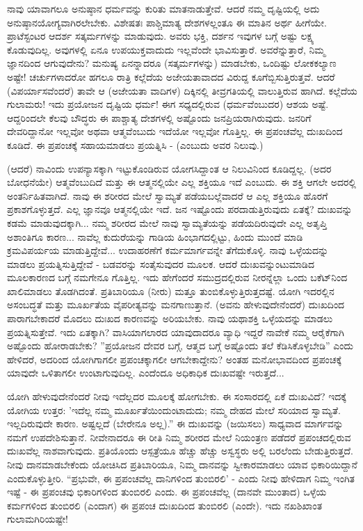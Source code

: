 ನಾವು ಯಾವಾಗಲೂ ಅನುಷ್ಠಾನ ಧರ್ಮವನ್ನು ಕುರಿತು ಮಾತನಾಡುತ್ತೇವೆ. ಆದರೆ ನಮ್ಮ ದೃಷ್ಟಿಯಲ್ಲಿ ಅದು ಅನುಷ್ಠಾನಯೋಗ್ಯವಾಗಿರಲೇಬೇಕು. ವಿಶೇಷತಃ ಪಾಶ್ಚಿಮಾತ್ಯ ದೇಶಗಳಲ್ಲಂತೂ ಈ ಮಾತಿನ ಅರ್ಥ ಹೀಗೆಯೇ. ಪ್ರಾಟೆಸ್ಟಂಟರ ಆದರ್ಶ ಸತ್ಕರ್ಮಗಳನ್ನು ಮಾಡುವುದು. ಅವರು ಭಕ್ತಿ, ದರ್ಶನ ಇವುಗಳ ಬಗ್ಗೆ ಅಷ್ಟು ಲಕ್ಷ್ಯ ಕೊಡುವುದಿಲ್ಲ. ಅವುಗಳಲ್ಲಿ ಏನೂ ಉಪಯುಕ್ತವಾದುದು ಇಲ್ಲವೆಂದೇ ಭಾವಿಸುತ್ತಾರೆ. ಅವರೆನ್ನುತ್ತಾರೆ, ನಿಮ್ಮ ಜ್ಞಾನದಿಂದ ಆಗುವುದೇನು? ಮನುಷ್ಯ ಏನನ್ನಾದರೂ (ಸತ್ಕರ್ಮಗಳನ್ನು) ಮಾಡಬೇಕು, ಒಂದಿಷ್ಟು ಲೋಕಕಲ್ಯಾಣ ಅಷ್ಟೇ! ಚರ್ಚುಗಳಾದರೋ ಹಗಲೂ ರಾತ್ರಿ ಕಲ್ಲೆದೆಯ ಅಜೇಯತಾವಾದದ ವಿರುದ್ದ ಕೂಗೆಬ್ಬಿಸುತ್ತಿರುತ್ತವೆ. ಆದರೆ \break (ವಿಪರ್ಯಾಸವೆಂದರೆ) ತಾವೇ ಆ (ಅಜೇಯತಾ ವಾದಿಗಳ) ದಿಕ್ಕಿನಲ್ಲಿ ತೀವ್ರಗತಿಯಲ್ಲಿ ವಾಲುತ್ತಿರುವ ಹಾಗಿದೆ. ಕಲ್ಲೆದೆಯ ಗುಲಾಮರು! ಇದು ಪ್ರಯೋಜನ ದೃಷ್ಟಿಯ ಧರ್ಮ! ಈಗ ಸಧ್ಯದಲ್ಲಿರುವ (ಧರ್ಮವೆಂಬುದರ) ಆಶಯ ಅಷ್ಟೆ. ಆದ್ದರಿಂದಲೇ ಕೆಲವು ಬೌದ್ಧರು ಈ ಪಾಶ್ಚಾತ್ಯ ದೇಶಗಳಲ್ಲಿ ಅಷ್ಟೊಂದು ಜನಪ್ರಿಯರಾಗಿರುವುದು. ಜನರಿಗೆ ದೇವರಿದ್ದಾನೋ ಇಲ್ಲವೋ ಅಥವಾ ಆತ್ಮವೆಂಬುದು ಇದೆಯೋ ಇಲ್ಲವೋ ಗೊತ್ತಿಲ್ಲ. ಈ ಪ್ರಪಂಚವೆಲ್ಲ ದುಃಖದಿಂದ ಕೂಡಿದೆ. ಈ ಪ್ರಪಂಚಕ್ಕೆ ಸಹಾಯಮಾಡಲು ಪ್ರಯತ್ನಿಸಿ - (ಎಂಬುದು ಅವರ ನಿಲುವು.)

(ಆದರೆ) ನಾವಿಂದು ಉಪನ್ಯಾಸಕ್ಕಾಗಿ ಇಟ್ಟುಕೊಂಡಿರುವ ಯೋಗಸಿದ್ದಾಂತ ಆ ನಿಲುವಿನಿಂದ ಕೂಡಿದ್ದಲ್ಲ. (ಅದರ ಬೋಧನೆಯೇ) ಆತ್ಮವೆಂಬುದಿದೆ ಮತ್ತು ಈ ಆತ್ಮನಲ್ಲಿಯೇ ಎಲ್ಲ ಶಕ್ತಿಯೂ ಇದೆ ಎಂಬುದು. ಈ ಶಕ್ತಿ ಆಗಲೇ ಅದರಲ್ಲಿ ಅಂತರ್ನಿಹಿತವಾಗಿದೆ. ನಾವು ಈ ಶರೀರದ ಮೇಲೆ ಸ್ವಾಮ್ಯತೆ ಪಡೆಯಬಲ್ಲೆವಾದರೆ ಆ ಎಲ್ಲ ಶಕ್ತಿಯೂ ಹೊರಗೆ ಪ್ರಕಾಶಗೊಳ್ಳುತ್ತದೆ. ಎಲ್ಲ ಜ್ಞಾನವೂ ಆತ್ಮನಲ್ಲಿಯೇ ಇದೆ. ಜನ ಇಷ್ಟೊಂದು ಪರದಾಡುತ್ತಿರುವುದು ಏತಕ್ಕೆ? ದುಃಖವನ್ನು ಕಡಮೆ ಮಾಡುವುದಕ್ಕಾಗಿ... ನಮ್ಮ ಶರೀರದ ಮೇಲೆ ನಾವು ಸ್ವಾಮ್ಯತೆಯನ್ನು ಪಡೆಯದಿರುವುದೇ ಎಲ್ಲ ಅತೃಪ್ತಿ ಅಶಾಂತಿಗೂ ಕಾರಣ... ನಾವೆಲ್ಲ ಕುದುರೆಯನ್ನು ಗಾಡಿಯ ಹಿಂಭಾಗದಲ್ಲಿಟ್ಟು, ಹಿಂದು ಮುಂದೆ ಮಾಡಿ ಕ್ರಮವಿಪರ್ಯಯ ಮಾಡುತ್ತಿದ್ದೇವೆ... ಉದಾಹರಣೆಗೆ ಕರ್ಮಮಾರ್ಗವನ್ನೇ ತೆಗೆದುಕೊಳ್ಳಿ. ನಾವು ಒಳ್ಳೆಯದನ್ನು ಮಾಡಲು ಪ್ರಯತ್ನಿಸುತ್ತಿದ್ದೇವೆ - ಬಡವರನ್ನು ಸಂತೈಸುವುದರ ಮೂಲಕ. ಆದರೆ ದುಃಖವನ್ನುಂಟುಮಾಡಿದ ಮೂಲಕಾರಣದ ಬಗ್ಗೆ ನಮಗೇನೂ ಗೊತ್ತಿಲ್ಲ. ಇದು ಹೇಗೆಂದರೆ ಸಮುದ್ರದಲ್ಲಿರುವ ನೀರನ್ನೆಲ್ಲಾ ಒಂದು ಬಕೆಟ್‌ನಿಂದ ಖಾಲಿಮಾಡಲು ತೊಡಗಿದಂತೆ. ಪ್ರತಿಬಾರಿಯೂ (ನೀರು) ಮತ್ತೂ ತುಂಬಿಕೊಳ್ಳುತ್ತಿರುತ್ತದಷ್ಟೆ. ಯೋಗಿ ಇದರಲ್ಲಿನ ಅಸಂಬದ್ಧತೆ ಮತ್ತು ಮೂರ್ಖತೆಯ ವೈಪರೀತ್ಯವನ್ನು ಮನಗಾಣುತ್ತಾನೆ. (ಅವನು ಹೇಳುವುದೇನೆಂದರೆ) ದುಃಖದಿಂದ ಪಾರಾಗಬೇಕಾದರೆ ಮೊದಲು ದುಃಖದ ಕಾರಣವನ್ನು ಅರಿಯಬೇಕು. ನಾವು ಯಥಾಶಕ್ತಿ ಒಳ್ಳೆಯದನ್ನು ಮಾಡಲು ಪ್ರಯತ್ನಿಸುತ್ತೇವೆ. ಇದು ಏತಕ್ಕಾಗಿ? ವಾಸಿಯಾಗಲಾರದ ಯಾವುದಾದರೂ ವ್ಯಾಧಿ ಇದ್ದರೆ ನಾವೇಕೆ ನಮ್ಮ ಆರೈಕೆಗಾಗಿ ಅಷ್ಟೊಂದು ಹೋರಾಡಬೇಕು? ''ಪ್ರಯೋಜನ ದೇವರ ಬಗ್ಗೆ, ಆತ್ಮದ ಬಗ್ಗೆ ಅಷ್ಟೊಂದು ತಲೆ ಕೆಡಿಸಿಕೊಳ್ಳಬೇಡಿ'' ಎಂದು ಹೇಳಿದರೆ, ಅದರಿಂದ ಯೋಗಿಗಾಗಲೀ ಪ್ರಪಂಚಕ್ಕಾಗಲೀ ಆಗಬೇಕಾದ್ದೇನು? ಅಂತಹ ಮನೋಭಾವದಿಂದ ಪ್ರಪಂಚಕ್ಕೆ ಯಾವುದೇ ಒಳಿತಾಗಲೀ ಉಂಟಾಗುವುದಿಲ್ಲ. ಎಂದೆಂದೂ ಅಧಿಕಾಧಿಕ ದುಃಖವಷ್ಟೇ ಇರುತ್ತದೆ...

ಯೋಗಿ ಹೇಳುವುದೇನೆಂದರೆ ನೀವು ಇದೆಲ್ಲದರ ಮೂಲಕ್ಕೆ ಹೋಗಬೇಕು. ಈ ಸಂಸಾರದಲ್ಲಿ ಏಕೆ ದುಃಖವಿದೆ? ಇದಕ್ಕೆ ಯೋಗಿಯ ಉತ್ತರ: 'ಇದೆಲ್ಲ ನಮ್ಮ ಮೂರ್ಖತೆಯಿಂದುಂಟಾದುದು; ನಮ್ಮ ದೇಹದ ಮೇಲೆ ಸರಿಯಾದ ಸ್ವಾಮ್ಯತೆ. ಇಲ್ಲದಿರುವುದೇ ಕಾರಣ. ಅಷ್ಟಲ್ಲದೆ (ಬೇರೇನೂ ಅಲ್ಲ).” ಈ ದುಃಖವನ್ನು (ಜಯಿಸಲು) ಸಾಧ್ಯವಾದ ಮಾರ್ಗವನ್ನು ನಮಗೆ ಉಪದೇಶಿಸುತ್ತಾನೆ. ನೀವೇನಾದರೂ ಈ ರೀತಿ ನಿಮ್ಮ ಶರೀರದ ಮೇಲೆ ನಿಯಂತ್ರಣ ಪಡೆದರೆ ಪ್ರಪಂಚದಲ್ಲಿರುವ ದುಃಖವೆಲ್ಲ ನಾಶವಾಗುವುದು. ಪ್ರತಿಯೊಂದು ಆಸ್ಪತ್ರೆಯೂ ಹೆಚ್ಚು ಹೆಚ್ಚು ಅಸ್ವಸ್ಥರು ಅಲ್ಲಿ ಬರಲೆಂದು ಬೇಡುತ್ತಿರುತ್ತದೆ. ನೀವು ದಾನಮಾಡಬೇಕೆಂದು ಯೋಚಿಸಿದ ಪ್ರತಿಬಾರಿಯೂ, ನಿಮ್ಮ ದಾನವನ್ನು ಸ್ವೀಕಾರಮಾಡಲು ಯಾವ ಭಿಕಾರಿಯಿದ್ದಾನೆ ಎಂದುಕೊಳ್ಳುತ್ತೀರಿ. “ಪ್ರಭುವೇ, ಈ ಪ್ರಪಂಚವೆಲ್ಲ ದಾನಿಗಳಿಂದ ತುಂಬಿರಲಿ' - ಎಂದು ನೀವು ಹೇಳಿದಾಗ ನಿಮ್ಮ ಇಂಗಿತ ಇಷ್ಟೆ - ಈ ಪ್ರಪಂಚವು ಭಿಕಾರಿಗಳಿಂದ ತುಂಬಿರಲಿ ಎಂದು. ಈ ಪ್ರಪಂಚವೆಲ್ಲ (ದಾನವೇ ಮುಂತಾದ) ಒಳ್ಳೆಯ ಕರ್ಮಗಳಿಂದ ತುಂಬಿರಲಿ (ಎಂದಾಗ) ಈ ಪ್ರಪಂಚ ದುಃಖದಿಂದ ತುಂಬಿರಲಿ (ಎಂದೇ). ಇದು ನಖಶಿಖಾಂತ ಗುಲಾಮಗಿರಿಯಷ್ಟೇ!

